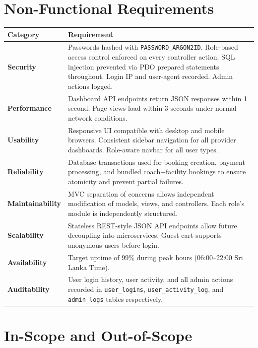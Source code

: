 \documentclass[12pt,a4paper]{report}
\begin{document}
\section{Non-Functional Requirements}

\begin{center}
\begin{tabular}{p{3.5cm} p{10.5cm}}
\toprule
\textbf{Category} & \textbf{Requirement}\\
\midrule
\textbf{Security}        & Passwords hashed with \texttt{PASSWORD\_ARGON2ID}. Role-based access control enforced on every controller action. SQL injection prevented via PDO prepared statements throughout. Login IP and user-agent recorded. Admin actions logged.\\
\textbf{Performance}     & Dashboard API endpoints return JSON responses within 1 second. Page views load within 3 seconds under normal network conditions.\\
\textbf{Usability}       & Responsive UI compatible with desktop and mobile browsers. Consistent sidebar navigation for all provider dashboards. Role-aware navbar for all user types.\\
\textbf{Reliability}     & Database transactions used for booking creation, payment processing, and bundled coach+facility bookings to ensure atomicity and prevent partial failures.\\
\textbf{Maintainability} & MVC separation of concerns allows independent modification of models, views, and controllers. Each role's module is independently structured.\\
\textbf{Scalability}     & Stateless REST-style JSON API endpoints allow future decoupling into microservices. Guest cart supports anonymous users before login.\\
\textbf{Availability}    & Target uptime of 99\% during peak hours (06:00--22:00 Sri Lanka Time).\\
\textbf{Auditability}    & User login history, user activity, and all admin actions recorded in \texttt{user\_logins}, \texttt{user\_activity\_log}, and \texttt{admin\_logs} tables respectively.\\
\bottomrule
\end{tabular}
\end{center}

\section{In-Scope and Out-of-Scope}
\end{document}
